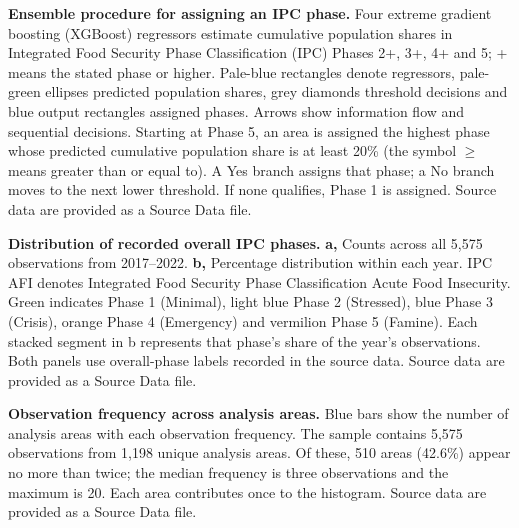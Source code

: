 \caption{\textbf{Ensemble procedure for assigning an IPC phase.} Four extreme gradient boosting (XGBoost) regressors estimate cumulative population shares in Integrated Food Security Phase Classification (IPC) Phases 2+, 3+, 4+ and 5; + means the stated phase or higher. Pale-blue rectangles denote regressors, pale-green ellipses predicted population shares, grey diamonds threshold decisions and blue output rectangles assigned phases. Arrows show information flow and sequential decisions. Starting at Phase 5, an area is assigned the highest phase whose predicted cumulative population share is at least 20\% (the symbol $\geq$ means greater than or equal to). A Yes branch assigns that phase; a No branch moves to the next lower threshold. If none qualifies, Phase 1 is assigned. Source data are provided as a Source Data file.}

\caption{\textbf{Distribution of recorded overall IPC phases.} \textbf{a,} Counts across all 5,575 observations from 2017–2022. \textbf{b,} Percentage distribution within each year. IPC AFI denotes Integrated Food Security Phase Classification Acute Food Insecurity. Green indicates Phase 1 (Minimal), light blue Phase 2 (Stressed), blue Phase 3 (Crisis), orange Phase 4 (Emergency) and vermilion Phase 5 (Famine). Each stacked segment in b represents that phase's share of the year's observations. Both panels use overall-phase labels recorded in the source data. Source data are provided as a Source Data file.}

\caption{\textbf{Observation frequency across analysis areas.} Blue bars show the number of analysis areas with each observation frequency. The sample contains 5,575 observations from 1,198 unique analysis areas. Of these, 510 areas (42.6\%) appear no more than twice; the median frequency is three observations and the maximum is 20. Each area contributes once to the histogram. Source data are provided as a Source Data file.}

